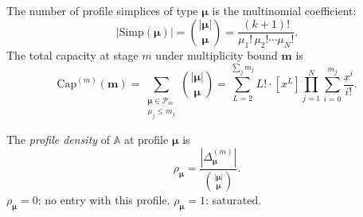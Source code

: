 \begin{proposition}\label{prop:profile-capacity}
The number of profile simplices of type $\boldsymbol{\mu}$ is the multinomial coefficient:
\[
  |\mathrm{Simp}(\boldsymbol{\mu})| = \binom{|\boldsymbol{\mu}|}{\boldsymbol{\mu}}
  = \frac{(k+1)!}{\mu_1!\, \mu_2! \cdots \mu_N!}.
\]
The total capacity at stage $m$ under multiplicity bound $\mathbf{m}$ is
\[
  \mathrm{Cap}^{(m)}(\mathbf{m}) = \sum_{\substack{\boldsymbol{\mu} \in \mathcal{P}_m \\ \mu_j \leq m_j}}
  \binom{|\boldsymbol{\mu}|}{\boldsymbol{\mu}}
  = \sum_{L=2}^{\sum_j m_j} L!\cdot[x^L]\prod_{j=1}^{N}
  \sum_{i=0}^{m_j}\frac{x^i}{i!}.
\]
\end{proposition}

\begin{definition}\label{def:profile-density}
The \emph{profile density} of $\mathbb{A}$ at profile $\boldsymbol{\mu}$ is
\[
  \rho_{\boldsymbol{\mu}} = \frac{|\Delta^{(m)}_{\boldsymbol{\mu}}|}{\binom{|\boldsymbol{\mu}|}{\boldsymbol{\mu}}}.
\]
$\rho_{\boldsymbol{\mu}} = 0$: no entry with this profile. $\rho_{\boldsymbol{\mu}} = 1$: saturated.
\end{definition}

